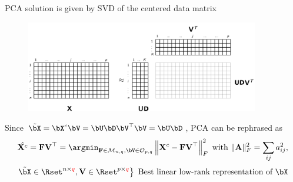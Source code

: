 \documentclass{beamer}\usepackage[]{graphicx}\usepackage[]{color}
\begin{document}
\begin{frame}{PCA solution is given by SVD of the centered data matrix}

\begin{figure}[ht]
  \centering
  \includegraphics[height=4cm]{figures/matrix_factorization}
\end{figure}

Since $\tilde\bX = \mathbf{\bX}^c \bV =  \bU \bD \bV^\top \bV = \bU \bD$, PCA can be rephrased as
\[ \hat{\mathbf{X}^c} = \mathbf{FV}^\top =  \argmin_{\mathbf{F}\in\mathcal{M}_{n,q},\bV\in\mathcal{O}_{p,q} } \left\| \mathbf{X}^c - \mathbf{FV}^\top \right\|_F^2 \text{ with } \|\mathbf{A}\|_F^2 = \sum_{ij} a_{ij}^2, 
\]
\[
  \left. \tilde\bX \in\Rset^{n\times \textcolor{red}{q}}, \mathbf{V}\in\Rset^{p\times \textcolor{red}{q}} \right\} \ \text{Best linear low-rank representation of $\bX$}
\]

\end{frame}
% 
% 
% 
% 
% 
% 
% 
\end{document}

